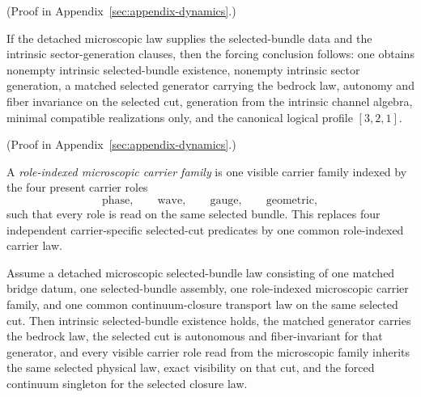 (Proof in Appendix~\ref{sec:appendix-dynamics}.)

\begin{theorem}
\label{thm:detached-microscopic-forcing-interface}
If the detached microscopic law supplies the selected-bundle data
and the intrinsic sector-generation clauses, then the forcing conclusion follows: one
obtains nonempty intrinsic selected-bundle existence, nonempty intrinsic
sector generation, a matched selected generator carrying the bedrock law,
autonomy and fiber invariance on the selected cut, generation from the
intrinsic channel algebra, minimal compatible realizations only, and the
canonical logical profile \([3,2,1]\).
\end{theorem}

(Proof in Appendix~\ref{sec:appendix-dynamics}.)

\begin{definition}
\label{def:role-indexed-microscopic-carrier-family}
A \emph{role-indexed microscopic carrier family} is one visible carrier family
indexed by the four present carrier roles
\[
\mathrm{phase},\qquad \mathrm{wave},\qquad \mathrm{gauge},\qquad \mathrm{geometric},
\]
such that every role is read on the same selected bundle. This replaces four
independent carrier-specific selected-cut predicates by one common role-indexed
carrier law.
\end{definition}

\begin{theorem}
\label{thm:role-indexed-microscopic-law-forces-selected-bundle-closure-readout}
Assume a detached microscopic selected-bundle law consisting of one matched
bridge datum, one selected-bundle assembly, one role-indexed microscopic
carrier family, and one common continuum-closure transport law on the same
selected cut. Then intrinsic selected-bundle existence holds,
the matched generator carries the bedrock law, the selected cut is autonomous
and fiber-invariant for that generator, and every visible carrier role read
from the microscopic family inherits the same selected physical law, exact
visibility on that cut, and the forced continuum singleton for the selected
closure law.
\end{theorem}

